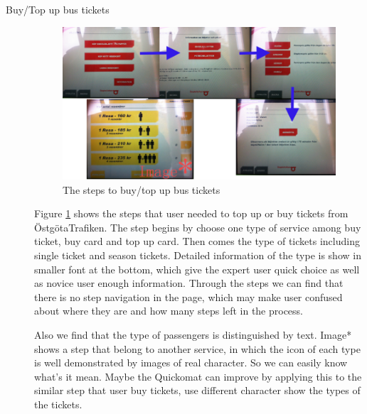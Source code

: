 \documentclass[twocolumn]{article}
\begin{document}
\begin{description}
  \item[Buy/Top up bus tickets]
    \begin{figure}
      \centering
      \includegraphics[width=.8\textwidth]{fig/buy-bus-ticket.png}
      \caption{The steps to buy/top up bus tickets}
      \label{fig:buy-bus-ticket}
    \end{figure}
    Figure \ref{fig:buy-bus-ticket} shows the steps that user needed to top up or buy tickets from ÖstgötaTrafiken. The step begins by choose one type of service among buy ticket, buy card and top up card. Then comes the type of tickets including single ticket and season tickets. Detailed information of the type is show in smaller font at the bottom, which give the expert user quick choice as well as novice user enough information. Through the steps we can find that there is no step navigation in the page, which may make user confused about where they are and how many steps left in the process.

    Also we find that the type of passengers is distinguished by text. Image* shows a step that belong to another service, in which the icon of each type is well demonstrated by images of real character. So we can easily know what’s it mean. Maybe the Quickomat can improve by applying this to the similar step that user buy tickets, use different character show the types of the tickets.


\end{description}
\end{document}
